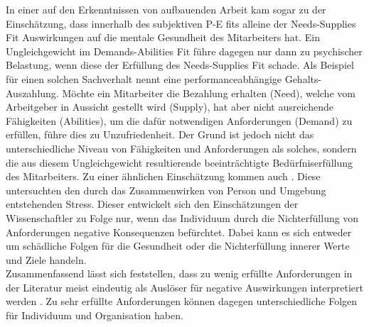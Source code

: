 In einer auf den Erkenntnissen von \textcite{copingAndAdaption:1974} aufbauenden Arbeit kam \textcite{harrison:1978} sogar zu der Einschätzung, dass innerhalb des subjektiven P-E fits alleine der Needs-Supplies Fit Auswirkungen auf die mentale Gesundheit des Mitarbeiters hat. Ein Ungleichgewicht im Demands-Abilities Fit führe dagegen nur dann zu psychischer Belastung, wenn diese der Erfüllung des Needs-Supplies Fit schade. Als Beispiel für einen solchen Sachverhalt nennt \textcite{harrison:1978} eine performanceabhängige Gehalts-Auszahlung. Möchte ein Mitarbeiter die Bezahlung erhalten (Need), welche vom Arbeitgeber in Aussicht gestellt wird (Supply), hat aber nicht ausreichende Fähigkeiten (Abilities), um die dafür notwendigen Anforderungen (Demand) zu erfüllen, führe dies zu Unzufriedenheit. Der Grund ist jedoch nicht das unterschiedliche Niveau von Fähigkeiten und Anforderungen als solches, sondern die aus diesem Ungleichgewicht resultierende beeinträchtigte Bedürfniserfüllung des Mitarbeiters. Zu einer ähnlichen Einschätzung kommen auch \textcite[S. 1ff.]{lazarus:1978}. Diese untersuchten den durch das Zusammenwirken von Person und Umgebung entstehenden Stress. Dieser entwickelt sich den Einschätzungen der Wissenschaftler zu Folge nur, wenn das Individuum durch die Nichterfüllung von Anforderungen negative Konsequenzen befürchtet. Dabei kann es sich entweder um schädliche Folgen für die Gesundheit oder die Nichterfüllung innerer Werte und Ziele handeln. \\
Zusammenfassend lässt sich feststellen, dass zu wenig erfüllte Anforderungen in der Literatur meist eindeutig als Auslöser für negative Auswirkungen interpretiert werden \cite[S. 5]{schuler:1980}. Zu sehr erfüllte Anforderungen können dagegen unterschiedliche Folgen für Individuum und Organisation haben.

